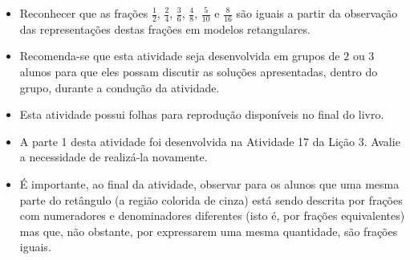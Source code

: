 \begin{multicols}{2}


\begin{objetivos}[label=chap4-ativ6]{}{}
\begin{itemize} %
    \item       Reconhecer que as frações       $\frac{1}{2}$,
$\frac{2}{4}$,       $\frac{3}{6}$,       $\frac{4}{8}$,       $\frac{5}{10}$
   e       $\frac{8}{16}$       são iguais a partir da observação das
representações destas frações em modelos retangulares.
\end{itemize} %


\end{objetivos}

\begin{orientacoes}{}{}
\begin{itemize} %
    \item       Recomenda-se que esta atividade seja desenvolvida em grupos de
    $2$       ou       $3$       alunos para que eles possam discutir as
soluções apresentadas, dentro do grupo, durante a condução da atividade.
	\item  Esta atividade possui folhas para reprodução disponíveis no final do
livro.
\item 	A parte 1 desta atividade foi desenvolvida na Atividade 17 da Lição 3. Avalie a necessidade de realizá-la novamente.
    \item       É importante, ao final da atividade, observar para os alunos que
uma mesma parte do retângulo (a região colorida de cinza) está sendo descrita
por frações com numeradores e denominadores diferentes (isto é, por frações
equivalentes) mas que, não obstante, por expressarem uma mesma quantidade, são
frações iguais.
\end{itemize} %


 



\end{orientacoes}


\end{multicols}
